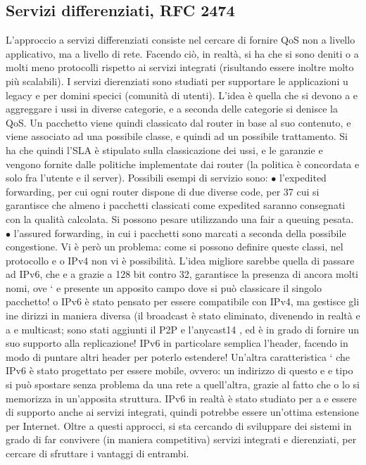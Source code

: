 \documentclass[a4paper,12pt]{article}
\begin{document}
\subsection{Servizi differenziati, RFC 2474}
L'approccio a servizi differenziati consiste nel cercare di fornire QoS non a livello
applicativo, ma a livello di rete. Facendo ciò, in realtà, si ha che si sono deniti
o
a
molti meno protocolli rispetto ai servizi integrati (risultando essere inoltre molto
più scalabili). I servizi dierenziati sono studiati per supportare le applicazioni
u
legacy e per domini specici (comunità di utenti). L'idea è quella che si devono
a
e
aggreggare i ussi in diverse categorie, e a seconda delle categorie si denisce la
QoS. Un pacchetto viene quindi classicato dal router in base al suo contenuto,
e viene associato ad una possibile classe, e quindi ad un possibile trattamento.
Si ha che quindi l'SLA è stipulato sulla classicazione dei ussi, e le garanzie
e
vengono fornite dalle politiche implementate dai router (la politica è concordata
e
solo fra l'utente e il server).
Possibili esempi di servizio sono:
$\bullet$ l'expedited forwarding, per cui ogni router dispone di due diverse code, per
37
cui si garantisce che almeno i pacchetti classicati come expedited saranno
consegnati con la qualità calcolata. Si possono pesare utilizzando una fair
a
queuing pesata.
$\bullet$ l'assured forwarding, in cui i pacchetti sono marcati a seconda della possibile congestione.
Vi è però un problema: come si possono definire queste classi, nel protocollo
e
o
IPv4 non vi è possibilità. L'idea migliore sarebbe quella di passare ad IPv6, che
e
a
grazie a 128 bit contro 32, garantisce la presenza di ancora molti nomi, ove `
e
presente un apposito campo dove si può classicare il singolo pacchetto!
o
IPv6 è stato pensato per essere compatibile con IPv4, ma gestisce gli ine
dirizzi in maniera diversa (il broadcast è stato eliminato, divenendo in realtà
e
a
e
multicast; sono stati aggiunti il P2P e l'anycast14 , ed è in grado di fornire un
suo supporto alla replicazione! IPv6 in particolare semplica l'header, facendo
in modo di puntare altri header per poterlo estendere! Un'altra caratteristica
` che IPv6 è stato progettato per essere mobile, ovvero: un indirizzo di questo
e
e
tipo si può spostare senza problema da una rete a quell'altra, grazie al fatto che
o
lo si memorizza in un'apposita struttura. IPv6 in realtà è stato studiato per
a e
essere di supporto anche ai servizi integrati, quindi potrebbe essere un'ottima
estensione per Internet.
Oltre a questi approcci, si sta cercando di sviluppare dei sistemi in grado
di far convivere (in maniera competitiva) servizi integrati e dierenziati, per
cercare di sfruttare i vantaggi di entrambi.
\end{document}

